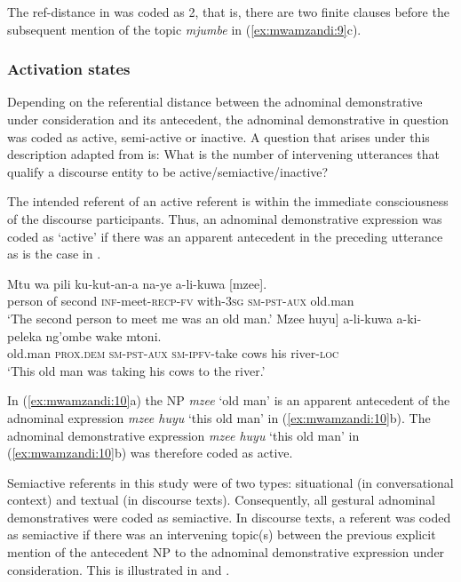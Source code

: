 \documentclass[output=paper,
modfonts
]{langscibook}
\begin{document}
The ref-distance in  was coded as 2, that is, there are two finite clauses before the subsequent mention of the topic \textit{mjumbe} in (\ref{ex:mwamzandi:9}c).

\subsubsection{Activation states}\label{sec:mwamzandi:2.2.3}

Depending on the referential distance between the adnominal demonstrative under consideration and its antecedent, the adnominal demonstrative in question was coded as active, semi-active or inactive. A question that arises under this description adapted from \citet{Chafe1987} is: What is the number of intervening utterances that qualify a discourse entity to be active/semiactive/inactive?

The intended referent of an active referent is within the immediate consciousness of the discourse participants. Thus, an adnominal demonstrative expression was coded as ‘active’ if there was an apparent antecedent in the preceding utterance as is the case in .

\ea\label{ex:mwamzandi:10}
  \ea
  \gll  Mtu wa pili ku-kut-an-a na-ye a-li-kuwa [mzee].\\
      person of second \textsc{inf}{}-meet-\textsc{recp}{}-\textsc{fv} with-\textsc{3sg} \textsc{sm}{}-\textsc{pst}{}-\textsc{aux} old.man\\
  \glt ‘The second person to meet me was an old man.’
  \ex
  \gll  {\ob}Mzee huyu] a-li-kuwa a-ki-peleka ng’ombe wake mtoni.\\
      {\db}old.man \textsc{prox}.\textsc{dem} \textsc{sm}{}-\textsc{pst}{}-\textsc{aux} \textsc{sm}{}-\textsc{ipfv}{}-take cows his river-\textsc{loc}\\
  \glt ‘This old man was taking his cows to the river.’
  \z
\z

In (\ref{ex:mwamzandi:10}a) the NP \textit{mzee} ‘old man’ is an apparent antecedent of the adnominal expression \textit{mzee huyu} ‘this old man’ in (\ref{ex:mwamzandi:10}b). The adnominal demonstrative expression \textit{mzee huyu} ‘this old man’ in (\ref{ex:mwamzandi:10}b) was therefore coded as active.

Semiactive referents in this study were of two types: situational (in conversational context) and textual (in discourse texts). Consequently, all gestural adnominal demonstratives were coded as semiactive. In discourse texts, a referent was coded as semiactive if there was an intervening topic(s) between the previous explicit mention of the antecedent NP to the adnominal demonstrative expression under consideration. This is illustrated in  and .
\end{document}
